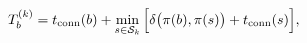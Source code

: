 \documentclass[border=2pt,12pt]{standalone}
\begin{document}
$\displaystyle T_b^{(k)}=t_{\rm conn}(b)+\min_{s\in\mathcal{S}_k}\Big[\delta\big(\pi(b),\pi(s)\big)+t_{\rm conn}(s)\Big],$
\end{document}
